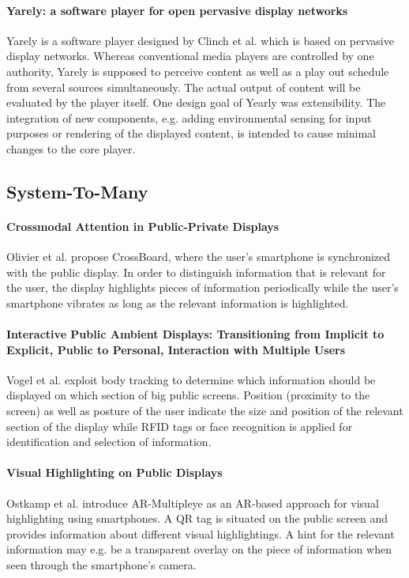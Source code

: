\paragraph{Yarely: a software player for open pervasive display networks}
Yarely is a software player designed by Clinch et al. \cite{Clinch_Yarely} which is based on pervasive display networks. Whereas conventional media players are controlled by one authority, Yarely is supposed to perceive content as well as a play out schedule from several sources simultaneously. The actual output of content will be evaluated by the player itself.
One design goal of Yearly was extensibility. The integration of new components, e.g. adding environmental sensing for input purposes or rendering of the displayed content, is intended to cause minimal changes to the core player.


\subsection{System-To-Many}

\paragraph{Crossmodal Attention in Public-Private Displays}
Olivier et al. \cite{Olivier_Crossmodal} propose CrossBoard, where the user’s smartphone is synchronized with the public display.
In order to distinguish information that is relevant for the user, the display highlights pieces of information periodically while the user’s smartphone vibrates as long as the relevant information is highlighted.

\paragraph{Interactive Public Ambient Displays: Transitioning from Implicit to Explicit, Public to Personal, Interaction with Multiple Users}
Vogel et al.\cite{Vogel_InteractivePublicAmbient} exploit body tracking to determine which information should be displayed on which section of big public screens. Position (proximity to the screen) as well as posture of the user indicate the size and position of the relevant section of the display while RFID tags or face recognition is applied for identification and selection of information.

\paragraph{Visual Highlighting on Public Displays}
Ostkamp et al. \cite{Ostkamp_VisualHighlighting} introduce AR-Multipleye as an AR-based approach for visual highlighting using smartphones. A QR tag is situated on the public screen and provides information about different visual highlightings. A hint for the relevant information may e.g. be a transparent overlay on the piece of information when seen through the smartphone’s camera.

